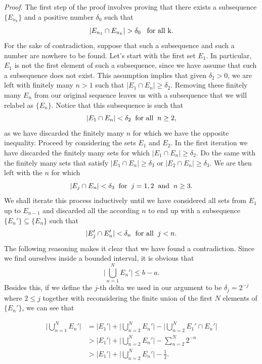 \documentclass[12pt]{article}
\begin{document}
\noindent\textit{Proof}. The first step of the proof involves proving that there exists a subsequence $\{E_{n_k}\}$ and a positive number $\delta_0$ such that $$|E_{n_1}\cap E_{n_k}|>\delta_0 \hspace{3mm}\text{for all k.}$$ For the sake of contradiction, suppose that such a subsequence and such a number are nowhere to be found. Let's start with the first set $E_1$. In particular, $E_1$ is not the first element of such a subsequence, since we have assume that such a subsequence does not exist. This assumption implies that given $\delta_2>0$, we are left with finitely many $n>1$ such that $|E_1\cap E_n|\geq\delta_2$. Removing these finitely many $E_n$ from our original sequence leaves us with a subsequence that we will relabel as $\{E_n\}$. Notice that this subsequence is such that $$|E_1\cap E_n|<\delta_2 \hspace{2mm}\text{for all}\hspace{2mm} n\geq2,$$ as we have discarded the finitely many $n$ for which we have the opposite inequality. Proceed by considering the sets $E_1$ and $E_2$. In the first iteration we have discarded the finitely many sets for which $|E_1\cap E_n|\geq\delta_2$. Do the same with the finitely many sets that satisfy $|E_1\cap E_n|\geq\delta_3$ or $|E_2\cap E_n|\geq\delta_3$. We are then left with the $n$ for which $$|E_j\cap E_n|<\delta_3 \hspace{2mm}\text{for}\hspace{2mm} j=1,2 \hspace{2mm}\text{and}\hspace{2mm} n\geq3.$$ We shall iterate this process inductively until we have considered all sets from $E_1$ up to $E_{n-1}$ and discarded all the according $n$ to end up with a subsequence $\{E_n'\} \subseteq \{E_n\}$ such that $$|E_j'\cap E_n'|<\delta_n \hspace{2mm} \text{for all} \hspace{2mm} j<n.$$ The following reasoning makes it clear that we have found a contradiction. Since we find ourselves inside a bounded interval, it is obvious that 
\begin{equation}
\label{3}
    \bigg|\bigcup_{n=1}^NE_n'\bigg|\leq b-a.
\end{equation}
Besides this, if we define the $j$-th delta we used in our argument to be $\delta_j=2^{-j}$ where $2\leq j$ together with reconsidering the finite union of the first $N$ elements of $\{E_n'\}$, we can see that 

\begin{align*}
    \bigg|\bigcup_{n=1}^NE_n'\bigg|&=|E_1'|+\bigg|\bigcup_{n=2}^NE_n'\bigg|-\bigg|\bigcup_{n=2}^NE_1'\cap E_n'\bigg|\\
    &>|E_1'|+\bigg|\bigcup_{n=2}^NE_n'\bigg|-\sum_{n=2}^N2^{-n}\\
    &>|E_1'|+\bigg|\bigcup_{n=2}^NE_n'\bigg|-\frac{1}{2}.
\end{align*}
\end{document}

